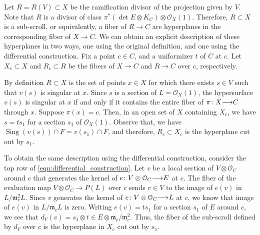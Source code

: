 \documentclass[11pt,reqno]{amsart}
\theoremstyle{plain}
\theoremstyle{definition}
\theoremstyle{remark}
\numberwithin{equation}{section}
\DeclareMathOperator{\sing}{Sing}
\renewcommand{\to}{{\longrightarrow}}
\numberwithin{equation}{section}
\renewcommand{\O}{\mathcal O}
\begin{document}
Let $R = R(V) \subset X$ be the ramification divisor of the projection given by $V$.
Note that $R$ is a divisor of class $\pi^*(\det E \otimes K_C) \otimes \O_X(1)$.
Therefore, $R \subset X$ is a sub-scroll, or equivalently, a fiber of $R \to C$ are hyperplanes in the corresponding fiber of $X \to C$.
We can obtain an explicit description of these hyperplanes in two ways, one using the original definition, and one using the differential construction.
Fix a point $c \in C$, and a uniformizer $t$ of $C$ at $c$.
Let $X_c \subset X$ and $R_c \subset R$ be the fibers of $X \to C$ and $R \to C$ over $c$, respectively.

By definition $R \subset X$ is the set of points $x \in X$ for which there exists $s \in V$ such that $v(s)$ is singular at $x$.
Since $s$ is a section of $L = \O_X(1)$, the hypersurface $v(s)$ is singular at $x$ if and only if it contains the entire fiber of $\pi \from X \to C$ through $x$.
Suppose $\pi (x) = c$.
Then, in an open set of $X$ containing $X_c$, we have $s = t s_1$ for a section $s_1$ of $\O_X(1)$.
Observe that, we have $\sing(v(s)) \cap F = v(s_1) \cap F$, and therefore, $R_c \subset X_c$ is the hyperplane cut out by $s_1$.

To obtain the same description using the differential construction, consider the top row of \eqref{eqn:differential_construction}.
Let $v$ be a local section of $V \otimes \O_C$ around $c$ that generates the kernel of $e \from V \otimes \O_C \to E$ at $c$.
The fiber of the evaluation map $V \otimes \O_C \to P(L)$ over $c$ sends $v \in V$ to the image of $e(v)$ in $L / \mathfrak m_c^2 L$.
Since $v$ generates the kernel of $e \from V \otimes \O_C \to L$ at $c$, we know that image of $e(v)$ in $L/ \mathfrak m_cL$ is zero.
Writing $e(v) = ts_1$ for a section $s_1$ of $E$ around $c$, we see that $d_V(v) = s_1 \otimes t \in E \otimes \mathfrak m_c/\mathfrak m_c^2$.
Thus, the fiber of the sub-scroll defined by $d_V$ over $c$ is the hyperplane in $X_c$ cut out by $s_1$.
\end{document}
